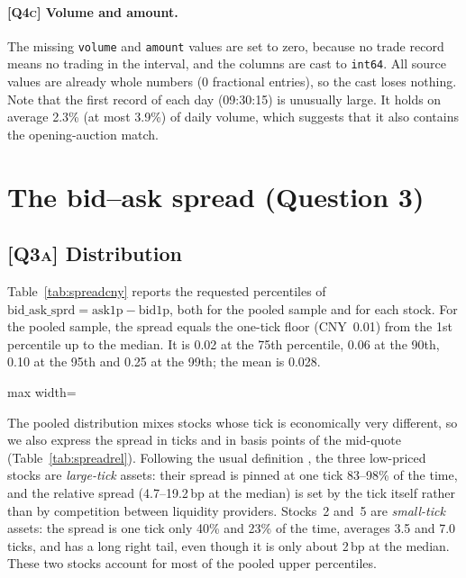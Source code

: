 \documentclass[11pt,a4paper]{article}
\newcommand{\Q}[1]{\textsc{[Q#1]}}
\newcommand{\code}[1]{\texttt{#1}}
\begin{document}
\paragraph{\Q{4c} Volume and amount.} The missing \code{volume} and \code{amount} values are set
to zero, because no trade record means no trading in the interval, and the columns are cast to
\code{int64}. All source values are already whole numbers (0 fractional entries), so the cast loses
nothing. Note that the first record of each day (09:30:15) is unusually large. It holds on
average 2.3\% (at most 3.9\%) of daily volume, which suggests that it also contains the
opening-auction match.

\section{The bid--ask spread (Question 3)}\label{sec:spread}

\subsection*{\Q{3a} Distribution}

Table~\ref{tab:spreadcny} reports the requested percentiles of
$\text{bid\_ask\_sprd} = \text{ask1p}-\text{bid1p}$, both for the pooled sample and for each stock.
For the pooled sample, the spread equals the one-tick floor (CNY~0.01) from the 1st percentile up
to the median. It is 0.02 at the 75th percentile, 0.06 at the 90th, 0.10 at the 95th and 0.25 at the
99th; the mean is 0.028.

\begin{table}[H]
\centering\small
\caption{\Q{3a} Percentiles of the bid--ask spread (CNY).}
\label{tab:spreadcny}
\begin{adjustbox}{max width=\textwidth}

\end{adjustbox}
\end{table}

The pooled distribution mixes stocks whose tick is economically very different, so we also
express the spread in ticks and in basis points of the mid-quote (Table~\ref{tab:spreadrel}). Following the usual definition \citep{eisler2012,dayri2015}, the
three low-priced stocks are \emph{large-tick} assets: their spread is pinned at one tick 83--98\% of
the time, and the relative spread (4.7--19.2\,bp at the median) is set by the tick itself rather than
by competition between liquidity providers. Stocks~2 and~5 are \emph{small-tick} assets: the spread
is one tick only 40\% and 23\% of the time, averages 3.5 and 7.0 ticks, and has a long right tail,
even though it is only about 2\,bp at the median. These two stocks account for most of the pooled
upper percentiles.
\end{document}
